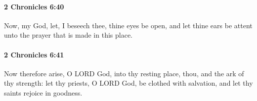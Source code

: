 		\paragraph{2 Chronicles 6:40} %
			\label{2CHRONICLES-6-40}

			Now, my God, let, I beseech thee, thine eyes be open, and let thine ears be attent unto the prayer that is made in this place.


		\paragraph{2 Chronicles 6:41} %
			\label{2CHRONICLES-6-41}

			Now therefore arise, O LORD God, into thy resting place, thou, and the ark of thy strength: let thy priests, O LORD God, be clothed with salvation, and let thy saints rejoice in goodness.


